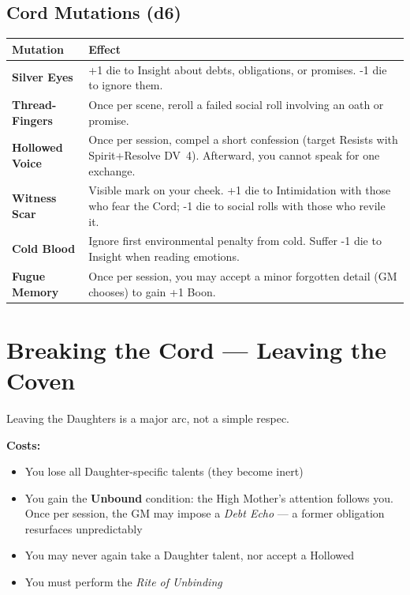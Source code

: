 \documentclass[10pt,twoside]{book}
\newcommand{\dv}[1]{\textsc{DV}~#1}
\begin{document}
\subsection*{Cord Mutations (d6)}

\begin{tabular}{@{}p{}p{}@{}}
\toprule
\textbf{Mutation} & \textbf{Effect} \\
\midrule
\textbf{Silver Eyes} & +1 die to Insight about debts, obligations, or promises. -1 die to ignore them. \\
\textbf{Thread-Fingers} & Once per scene, reroll a failed social roll involving an oath or promise. \\
\textbf{Hollowed Voice} & Once per session, compel a short confession (target Resists with Spirit+Resolve \dv{4}). Afterward, you cannot speak for one exchange. \\
\textbf{Witness Scar} & Visible mark on your cheek. +1 die to Intimidation with those who fear the Cord; -1 die to social rolls with those who revile it. \\
\textbf{Cold Blood} & Ignore first environmental penalty from cold. Suffer -1 die to Insight when reading emotions. \\
\textbf{Fugue Memory} & Once per session, you may accept a minor forgotten detail (GM chooses) to gain +1 Boon. \\
\bottomrule
\end{tabular}

\section{Breaking the Cord --- Leaving the Coven}

Leaving the Daughters is a major arc, not a simple respec.

\textbf{Costs:}
\begin{itemize}
\item You lose all Daughter-specific talents (they become inert)
\item You gain the \textbf{Unbound} condition: the High Mother's attention follows you. Once per session, the GM may impose a \textit{Debt Echo} --- a former obligation resurfaces unpredictably
\item You may never again take a Daughter talent, nor accept a Hollowed
\item You must perform the \textit{Rite of Unbinding}
\end{itemize}
\end{document}
